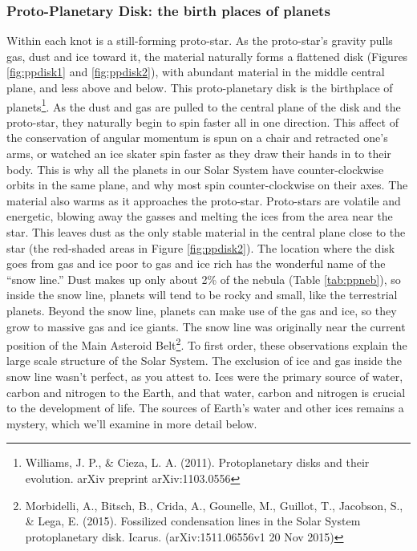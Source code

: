 \subsubsection{Proto-Planetary Disk: the birth places of planets}
Within each knot is a still-forming proto-star. As the proto-star's gravity pulls gas, dust and ice toward it, the material naturally forms a flattened disk (Figures \ref{fig:ppdisk1} and \ref{fig:ppdisk2}), with abundant material in the middle central plane, and less above and below. This proto-planetary disk is the birthplace of planets\footnote{Williams, J. P., \& Cieza, L. A. (2011). Protoplanetary disks and their evolution. arXiv preprint arXiv:1103.0556}. As the dust and gas are pulled to the central plane of the disk and the proto-star, they naturally begin to spin faster all in one direction. This affect of the conservation of angular momentum is spun on a chair and retracted one's arms, or watched an ice skater spin faster as they draw their hands in to their body. This is why all the planets in our Solar System have counter-clockwise orbits in the same plane, and why most spin counter-clockwise on their axes. The material also warms as it approaches the proto-star. Proto-stars are volatile and energetic, blowing away the gasses and melting the ices from the area near the star. This leaves dust as the only stable material in the central plane close to the star (the red-shaded areas in Figure \ref{fig:ppdisk2}). The location where the disk goes from gas and ice poor to gas and ice rich has the wonderful name of the ``snow line.'' Dust makes up only about 2\% of the nebula (Table \ref{tab:ppneb}), so inside the snow line, planets will tend to be rocky and small, like the terrestrial planets. Beyond the snow line, planets can make use of the gas and ice, so they grow to massive gas and ice giants. The snow line was originally near the current position of the Main Asteroid Belt\footnote{Morbidelli, A., Bitsch, B., Crida, A., Gounelle, M., Guillot, T., Jacobson, S., \& Lega, E. (2015). Fossilized condensation lines in the Solar System protoplanetary disk. Icarus. (arXiv:1511.06556v1 20 Nov 2015)}. To first order, these observations explain the large scale structure of the Solar System. The exclusion of ice and gas inside the snow line wasn't perfect, as you attest to. Ices were the primary source of water, carbon and nitrogen to the Earth, and that water, carbon and nitrogen is crucial to the development of life. The sources of Earth's water and other ices remains a mystery, which we'll examine in more detail below.\\

